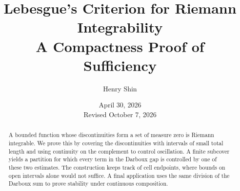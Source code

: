 \documentclass[11pt]{article}
\title{\vspace{-1.1cm}Lebesgue's Criterion for Riemann Integrability\\[0.2em]\large A Compactness Proof of Sufficiency}
\author{Henry Shin}
\date{April 30, 2026\\[0.25em]\small Revised October 7, 2026}
\begin{document}
\maketitle
\vspace{-0.6cm}
\begin{abstract}
A bounded function whose discontinuities form a set of measure zero is Riemann integrable. We prove this by covering the discontinuities with intervals of small total length and using continuity on the complement to control oscillation. A finite subcover yields a partition for which every term in the Darboux gap is controlled by one of these two estimates. The construction keeps track of cell endpoints, where bounds on open intervals alone would not suffice. A final application uses the same division of the Darboux sum to prove stability under continuous composition.
\end{abstract}
\end{document}
